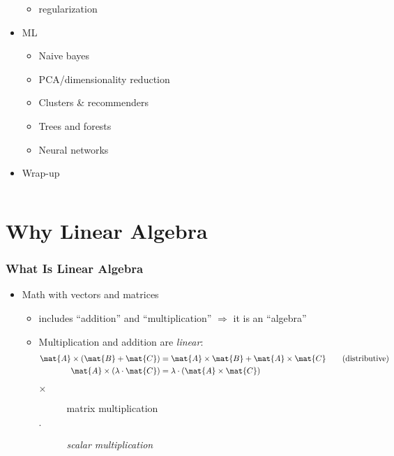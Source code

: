 \documentclass[mathserif, xcolor=table, svgnames]{beamer}
\begin{document}
\begin{frame}
\begin{columns}
\begin{column}{0.5\linewidth}
\begin{itemize}
\begin{itemize}
      \item regularization
      \end{itemize}
    \item ML
      \begin{itemize}
      \item Naive bayes
      \item PCA/dimensionality reduction
      \item Clusters \& recommenders
      \item Trees and forests
      \item Neural networks
      \end{itemize}
    \item Wrap-up
    \end{itemize}
  \end{column}
\end{columns}
\end{frame}

\section[Why?]{Why Linear Algebra}

\begin{frame}
  \frametitle{What Is Linear Algebra}
  \begin{itemize}
  \item Math with vectors and matrices
    \begin{itemize}
    \item includes ``addition'' and ``multiplication'' $\Rightarrow$
      it is an ``algebra''
    \item Multiplication and addition are \emph{linear}:
      \begin{align*}
        \mat{A} \times ( \mat{B} + \mat{C} ) 
        &=
          \mat{A} \times \mat{B} + \mat{A} \times \mat{C}
          \qquad\text{(distributive)}
        \\
        \mat{A} \times (\lambda \cdot \mat{C} ) 
        &=
          \lambda \cdot (\mat{A} \times \mat{C})
      \end{align*}
      \begin{description}
      \item[$\times$] matrix multiplication
      \item[$\cdot$] \emph{scalar multiplication}
      \end{description}
    \end{itemize}
  \end{itemize}
\end{frame}
\end{document}
